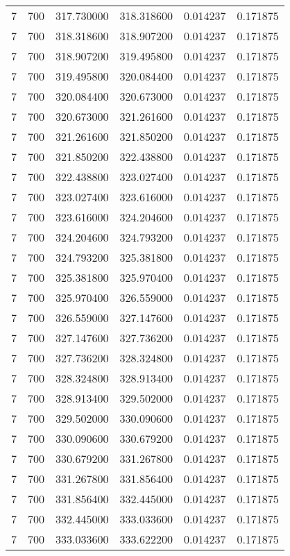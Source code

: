 \begin{longtable}{rrrrrr}
7 & 700 & 317.730000 & 318.318600 & 0.014237 & 0.171875 \\
7 & 700 & 318.318600 & 318.907200 & 0.014237 & 0.171875 \\
7 & 700 & 318.907200 & 319.495800 & 0.014237 & 0.171875 \\
7 & 700 & 319.495800 & 320.084400 & 0.014237 & 0.171875 \\
7 & 700 & 320.084400 & 320.673000 & 0.014237 & 0.171875 \\
7 & 700 & 320.673000 & 321.261600 & 0.014237 & 0.171875 \\
7 & 700 & 321.261600 & 321.850200 & 0.014237 & 0.171875 \\
7 & 700 & 321.850200 & 322.438800 & 0.014237 & 0.171875 \\
7 & 700 & 322.438800 & 323.027400 & 0.014237 & 0.171875 \\
7 & 700 & 323.027400 & 323.616000 & 0.014237 & 0.171875 \\
7 & 700 & 323.616000 & 324.204600 & 0.014237 & 0.171875 \\
7 & 700 & 324.204600 & 324.793200 & 0.014237 & 0.171875 \\
7 & 700 & 324.793200 & 325.381800 & 0.014237 & 0.171875 \\
7 & 700 & 325.381800 & 325.970400 & 0.014237 & 0.171875 \\
7 & 700 & 325.970400 & 326.559000 & 0.014237 & 0.171875 \\
7 & 700 & 326.559000 & 327.147600 & 0.014237 & 0.171875 \\
7 & 700 & 327.147600 & 327.736200 & 0.014237 & 0.171875 \\
7 & 700 & 327.736200 & 328.324800 & 0.014237 & 0.171875 \\
7 & 700 & 328.324800 & 328.913400 & 0.014237 & 0.171875 \\
7 & 700 & 328.913400 & 329.502000 & 0.014237 & 0.171875 \\
7 & 700 & 329.502000 & 330.090600 & 0.014237 & 0.171875 \\
7 & 700 & 330.090600 & 330.679200 & 0.014237 & 0.171875 \\
7 & 700 & 330.679200 & 331.267800 & 0.014237 & 0.171875 \\
7 & 700 & 331.267800 & 331.856400 & 0.014237 & 0.171875 \\
7 & 700 & 331.856400 & 332.445000 & 0.014237 & 0.171875 \\
7 & 700 & 332.445000 & 333.033600 & 0.014237 & 0.171875 \\
7 & 700 & 333.033600 & 333.622200 & 0.014237 & 0.171875 \\

\end{longtable}
